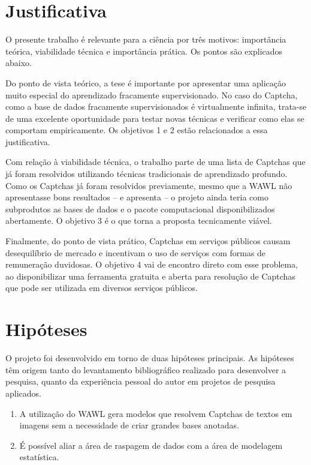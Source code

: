 \documentclass[12pt,twoside,brazilian]{book}
\begin{document}
\hypertarget{sec-justificativa}{%
\section{Justificativa}\label{sec-justificativa}}

O presente trabalho é relevante para a ciência por três motivos:
importância teórica, viabilidade técnica e importância prática. Os
pontos são explicados abaixo.

Do ponto de vista teórico, a tese é importante por apresentar uma
aplicação muito especial do aprendizado fracamente supervisionado. No
caso do Captcha, como a base de dados fracamente supervisionados é
virtualmente infinita, trata-se de uma excelente oportunidade para
testar novas técnicas e verificar como elas se comportam empiricamente.
Os objetivos 1 e 2 estão relacionados a essa justificativa.

Com relação à viabilidade técnica, o trabalho parte de uma lista de
Captchas que já foram resolvidos utilizando técnicas tradicionais de
aprendizado profundo. Como os Captchas já foram resolvidos previamente,
mesmo que a WAWL não apresentasse bons resultados -- e apresenta -- o
projeto ainda teria como subprodutos as bases de dados e o pacote
computacional disponibilizados abertamente. O objetivo 3 é o que torna a
proposta tecnicamente viável.

Finalmente, do ponto de vista prático, Captchas em serviços públicos
causam desequilíbrio de mercado e incentivam o uso de serviços com
formas de remuneração duvidosas. O objetivo 4 vai de encontro direto com
esse problema, ao disponibilizar uma ferramenta gratuita e aberta para
resolução de Captchas que pode ser utilizada em diversos serviços
públicos.

\hypertarget{sec-hipoteses}{%
\section{Hipóteses}\label{sec-hipoteses}}

O projeto foi desenvolvido em torno de duas hipóteses principais. As
hipóteses têm origem tanto do levantamento bibliográfico realizado para
desenvolver a pesquisa, quanto da experiência pessoal do autor em
projetos de pesquisa aplicados.

\begin{enumerate}
\def\labelenumi{\arabic{enumi}.}
\item
  A utilização do WAWL gera modelos que resolvem Captchas de textos em
  imagens sem a necessidade de criar grandes bases anotadas.
\item
  É possível aliar a área de raspagem de dados com a área de modelagem
  estatística.
\end{enumerate}
\end{document}
